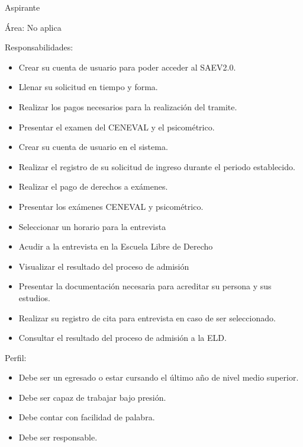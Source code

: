 \begin{Actor}{Aspirante}{}
	\item[Área:] No aplica
	\item[Responsabilidades:] \hspace{1pt}
	\begin{itemize}
		\item Crear su cuenta de usuario para poder acceder al SAEV2.0.
		\item Llenar su solicitud  en tiempo y forma.
		\item Realizar los pagos necesarios para la realización del tramite.
		\item Presentar el examen del CENEVAL y el psicométrico.
		\item Crear su cuenta de usuario en el sistema.
		\item Realizar el registro de su solicitud de ingreso durante el periodo establecido.
		\item Realizar el pago de derechos a exámenes.
		\item Presentar los exámenes CENEVAL y psicométrico.
		\item Seleccionar un horario para la entrevista
		\item Acudir a la entrevista en la Escuela Libre de Derecho
		\item Visualizar el resultado del proceso de admisión
        \item Presentar la documentación necesaria para acreditar su persona y sus estudios.
        \item Realizar su registro de cita para entrevista en caso de ser seleccionado.
        \item Consultar el resultado del proceso de admisión a la ELD.
	\end{itemize}
	\item[Perfil:] \hspace{1pt}
	\begin{itemize}
		\item Debe ser un egresado o estar cursando el último año de nivel medio superior. 
		\item Debe ser capaz de trabajar bajo presión.
		\item Debe contar con facilidad de palabra.
		\item Debe ser responsable.		
	\end{itemize}
\end{Actor}